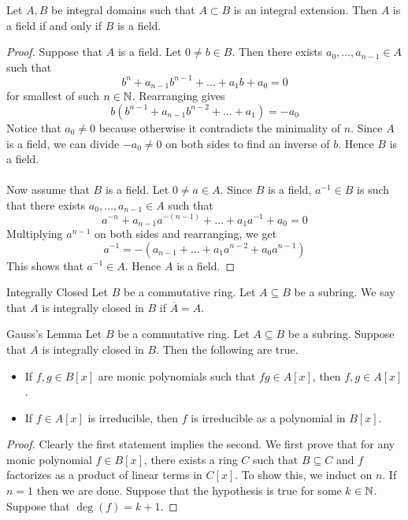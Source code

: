 \documentclass[a4paper]{article}
\begin{document}
\begin{lmm}{}{} Let $A,B$ be integral domains such that $A\subset B$ is an integral extension. Then $A$ is a field if and only if $B$ is a field. \tcbline
\begin{proof}
Suppose that $A$ is a field. Let $0\neq b\in B$. Then there exists $a_0,\dots,a_{n-1}\in A$ such that $$b^n+a_{n-1}b^{n-1}+\dots+a_1b+a_0=0$$ for smallest of such $n\in\mathbb{N}$. Rearranging gives $$b(b^{n-1}+a_{n-1}b^{n-2}+\dots+a_1)=-a_0$$ Notice that $a_0\neq 0$ because otherwise it contradicts the minimality of $n$. Since $A$ is a field, we can divide $-a_0\neq 0$ on both sides to find an inverse of $b$. Hence $B$ is a field. \\~\\

Now assume that $B$ is a field. Let $0\neq a\in A$. Since $B$ is a field, $a^{-1}\in B$ is such that there exists $a_0,\dots,a_{n-1}\in A$ such that $$a^{-n}+a_{n-1}a^{-(n-1)}+\dots+a_1a^{-1}+a_0=0$$ Multiplying $a^{n-1}$ on both sides and rearranging, we get $$a^{-1}=-\left(a_{n-1}+\dots+a_1a^{n-2}+a_0a^{n-1}\right)$$ This shows that $a^{-1}\in A$. Hence $A$ is a field. 
\end{proof}
\end{lmm}

\begin{defn}{Integrally Closed}{} Let $B$ be a commutative ring. Let $A\subseteq B$ be a subring. We say that $A$ is integrally closed in $B$ if $\overline{A}=A$. 
\end{defn}

\begin{thm}{Gauss's Lemma}{} Let $B$ be a commutative ring. Let $A\subseteq B$ be a subring. Suppose that $A$ is integrally closed in $B$. Then the following are true. 
\begin{itemize}
\item If $f,g\in B[x]$ are monic polynomials such that $fg\in A[x]$, then $f,g\in A[x]$. 
\item If $f\in A[x]$ is irreducible, then $f$ is irreducible as a polynomial in $B[x]$. 
\end{itemize} \tcbline
\begin{proof}
Clearly the first statement implies the second. We first prove that for any monic polynomial $f\in B[x]$, there exists a ring $C$ such that $B\subseteq C$ and $f$ factorizes as a product of linear terms in $C[x]$. To show this, we induct on $n$. If $n=1$ then we are done. Suppose that the hypothesis is true for some $k\in\mathbb{N}$. Suppose that $\deg(f)=k+1$. 
\end{proof}
\end{thm}
\end{document}
